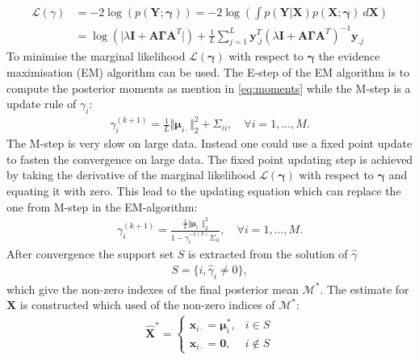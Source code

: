 \begin{align*}
\mathcal{L}(\gamma) &= - 2 \log(p (\mathbf{Y} ; \boldsymbol{\gamma})) = -2 \log \left( \int p (\mathbf{Y}  \vert \mathbf{X}) p (\mathbf{X} ; \boldsymbol{\gamma}) \ d\mathbf{X} \right) \\
&= \log ( \vert \lambda \mathbf{I} + \mathbf{A} \boldsymbol{\Gamma} \mathbf{A}^T \vert) + \frac{1}{L} \sum_{j=1}^L \mathbf{y}_{.j}^T \left( \lambda \mathbf{I} + \mathbf{A} \boldsymbol{\Gamma} \mathbf{A}^T\right)^{-1} \mathbf{y}_{.j}
\end{align*}
To minimise the marginal likelihood $\mathcal{L}(\boldsymbol{\gamma})$ with respect to $\boldsymbol{\gamma}$ the evidence maximisation (EM) algorithm can be used. The E-step of the EM algorithm is to compute the posterior moments as mention in \eqref{eq:moments} while the M-step is a update rule of $\gamma_i$:
\begin{align*}
\gamma_i^{(k+1)} = \frac{1}{L} \Vert \boldsymbol{\mu}_{i \cdot} \Vert_2^2 + \Sigma_{ii}, \quad \forall i = 1, \dots, M.
\end{align*}
The M-step is very slow on large data. Instead one could use a fixed point update to fasten the convergence on large data. The fixed point updating step is achieved by taking the derivative of the marginal likelihood $\mathcal{L}(\boldsymbol{\gamma})$ with respect to $\boldsymbol{\gamma}$ and equating it with zero. This lead to the updating equation which can replace the one from M-step in the EM-algorithm:
\begin{align*}
\gamma_i^{(k+1)} = \frac{\frac{1}{L} \Vert \boldsymbol{\mu}_{i \cdot} \Vert_2^2}{1 - \gamma_i^{-1 (k)} \Sigma_{ii}}, \quad \forall i = 1, \dots, M.
\end{align*}
After convergence the support set $S$ is extracted from the solution of $\hat{\gamma}$
\begin{align*}
S = \{ i, \hat{\gamma}_i \neq 0 \},
\end{align*}
which give the non-zero indexes of the final posterior mean $\mathcal{M}^\ast$. The estimate for $\mathbf{X}$ is constructed which used of the non-zero indices of $\mathcal{M}^\ast$:
\begin{align*}
\hat{\mathbf{X}}^\ast = 
\begin{cases}
\mathbf{x}_{i\cdot} = \boldsymbol{\mu}_i^\ast, & i \in S \\
\mathbf{x}_{i\cdot} = \mathbf{0}, & i \not \in S
\end{cases}
\end{align*}


